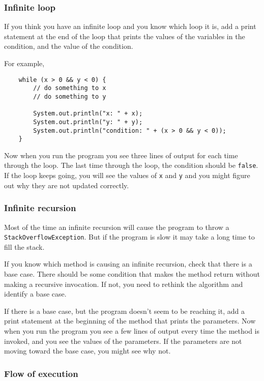 \documentclass[12pt]{book}
\theoremstyle{definition}
\begin{document}
\subsubsection*{Infinite loop}

If you think you have an infinite loop and you know
which loop it is, add a print statement at
the end of the loop that prints the values of the variables in
the condition, and the value of the condition.

For example,

\begin{lstlisting}
    while (x > 0 && y < 0) {
        // do something to x
        // do something to y

        System.out.println("x: " + x);
        System.out.println("y: " + y);
        System.out.println("condition: " + (x > 0 && y < 0));
    }
\end{lstlisting}
%
Now when you run the program you see three lines of output
for each time through the loop.  The last time through the
loop, the condition should be {\tt false}.  If the loop keeps
going, you will see the values of {\tt x} and {\tt y}
and you might figure out why they are not updated correctly.


\subsubsection*{Infinite recursion}

Most of the time an infinite recursion will cause the program
to throw a {\tt StackOverflowException}.  But if the program is
slow it may take a long time to fill the stack.

If you know which method is causing an infinite recursion, check that
there is a base case.  There should be some condition
that makes the method return without making a recursive
invocation.  If not, you need to rethink the algorithm and
identify a base case.

If there is a base case, but the program doesn't seem to be reaching
it, add a print statement at the beginning of the method that prints
the parameters.  Now when you run the program you see a few lines
of output every time the method is invoked, and you see the values of
the parameters.  If the parameters are not moving toward the base case,
you might see why not.


\subsubsection*{Flow of execution}
\end{document}
